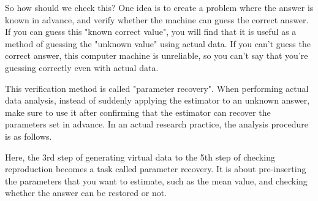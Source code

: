 \documentclass{ltjsbook}
\begin{document}
So how should we check this? One idea is to create a problem where the answer is known in advance, and verify whether the machine can guess the correct answer.
If you can guess this "known correct value", you will find that it is useful as a method of guessing the "unknown value" using actual data. If you can't guess the correct answer, this computer machine is unreliable, so you can't say that you're guessing correctly even with actual data.

This verification method is called "parameter recovery".
When performing actual data analysis, instead of suddenly applying the estimator to an unknown answer, make sure to use it after confirming that the estimator can recover the parameters set in advance.
In an actual research practice, the analysis procedure is as follows.

Here, the 3rd step of generating virtual data to the 5th step of checking reproduction becomes a task called parameter recovery. It is about pre-inserting the parameters that you want to estimate, such as the mean value, and checking whether the answer can be restored or not.
\end{document}
